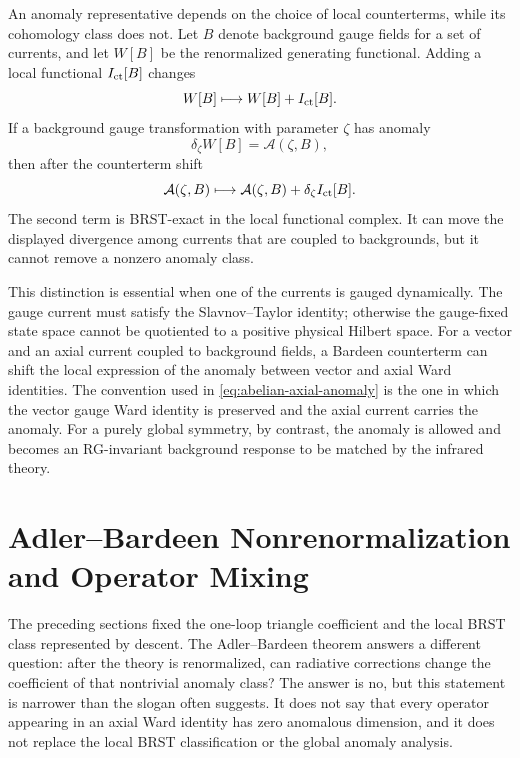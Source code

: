 An anomaly representative depends on the choice of local counterterms, while
its cohomology class does not.  Let \(B\) denote background gauge fields for a
set of currents, and let \(W[B]\) be the renormalized generating functional.
Adding a local functional \(I_{\rm ct}[B]\) changes
\[
  W[B]\longmapsto W[B]+I_{\rm ct}[B].
\]
If a background gauge transformation with parameter \(\zeta\) has anomaly
\[
  \delta_\zeta W[B]=\mathcal A(\zeta,B),
\]
then after the counterterm shift
\[
  \mathcal A(\zeta,B)
  \longmapsto
  \mathcal A(\zeta,B)+\delta_\zeta I_{\rm ct}[B].
\]
The second term is BRST-exact in the local functional complex.  It can move
the displayed divergence among currents that are coupled to backgrounds, but
it cannot remove a nonzero anomaly class.

This distinction is essential when one of the currents is gauged dynamically.
The gauge current must satisfy the Slavnov--Taylor identity; otherwise the
gauge-fixed state space cannot be quotiented to a positive physical Hilbert
space.  For a vector and an axial current coupled to background fields, a
Bardeen counterterm can shift the local expression of the anomaly between
vector and axial Ward identities.  The convention used in
\eqref{eq:abelian-axial-anomaly} is the one in which the vector gauge Ward
identity is preserved and the axial current carries the anomaly.  For a
purely global symmetry, by contrast, the anomaly is allowed and becomes an
RG-invariant background response to be matched by the infrared theory.

\section{Adler--Bardeen Nonrenormalization and Operator Mixing}
\label{sec:adler-bardeen-nonrenormalization}

The preceding sections fixed the one-loop triangle coefficient and the local
BRST class represented by descent.  The Adler--Bardeen theorem answers a
different question: after the theory is renormalized, can radiative
corrections change the coefficient of that nontrivial anomaly class?  The
answer is no, but this statement is narrower than the slogan often suggests.
It does not say that every operator appearing in an axial Ward identity has
zero anomalous dimension, and it does not replace the local BRST
classification or the global anomaly analysis.

